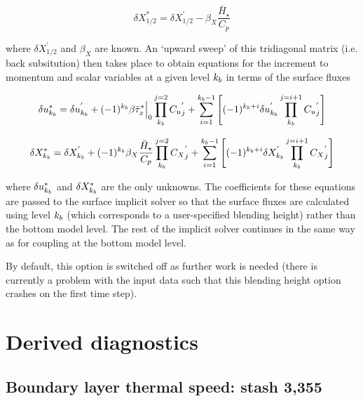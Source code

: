 \documentclass{UMDP_article}
\begin{document}
\begin{equation}
 \delta X_{1/2}^{*}=\delta X_{1/2}^{'}-\beta_X\frac{\bar{H}_\star}{C_p}
\end{equation}

where $\delta X_{1/2}^{'}$ and $\beta_X$ are known. An `upward sweep' of
this tridiagonal matrix (i.e. back subsitution) then takes place to
obtain equations for the increment to momentum and scalar variables at a
given level $k_{b}$ in terms of the surface fluxes

\begin{equation}
 \delta u_{k_{b}}^{*}=\delta u_{k_{b}}^{'}+(-1)^{k_{b}}\beta\bar{\tau}_{x}^{*}\Big|_{0} \prod^{j=2}_{k_{b}} {C_{u}}_{j}^{'} + \sum^{k_{b}-1}_{i=1} \left[(-1)^{k_{b}+i}\delta u_{k_{b}}^{'} \prod^{j=i+1}_{k_{b}} {C_{u}}_{j}^{'}\right]
\end{equation}

\begin{equation}
 \delta X_{k_{b}}^{*}=\delta X_{k_{b}}^{'}+(-1)^{k_{b}}\beta_X\frac{\bar{H}_\star}{C_p}  \prod^{j=2}_{k_{b}} {C_{X}}_{j}^{'} + \sum^{k_{b}-1}_{i=1} \left[(-1)^{k_{b}+i}\delta X_{k_{b}}^{'} \prod^{j=i+1}_{k_{b}} {C_{X}}_{j}^{'}\right]
\end{equation}

where $\delta u_{k_{b}}^{*}$ and $\delta X_{k_{b}}^{*}$ are the only unknowns.
The coefficients for these equations are passed to the surface implicit
solver so that the surface fluxes are calculated using level $k_{b}$
(which corresponds to a user-specified blending height) rather than 
the bottom model level. The rest of the implicit solver continues in the 
same way as for coupling at the bottom model level.

By default, this option is switched off as further work is needed 
(there is currently a problem with the input data such that this 
blending height option crashes on the first time step).


\section{Derived diagnostics}

\subsection{Boundary layer thermal speed: stash 3,355}
\end{document}
